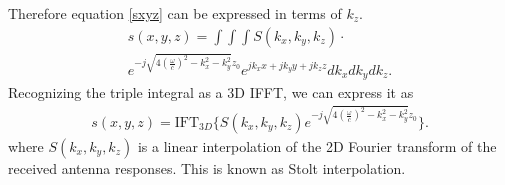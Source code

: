 \documentclass[twocolumn]{article}
\begin{document}
Therefore equation \ref{sxyz} can be expressed in terms of $k_z$.
\begin{gather}
	s(x,y,z) = \int \int \int    S(k_x, k_y, k_z) \cdot \nonumber \\
	e^{-j \sqrt{ 4 (\frac{\omega}{c})^2 - k_x^2 - k_y^2 } z_0} e^{j k_x x + j k_y y + j k_z z} dk_x dk_y dk_z.
\end{gather}
Recognizing the triple integral as a 3D IFFT, we can express it as
\begin{gather}
	s(x,y,z) = \text{IFT}_{3D}  \{  S(k_x, k_y, k_z) e^{-j \sqrt{ 4 (\frac{\omega}{c})^2 - k_x^2 - k_y^2 } z_0} \} .
\end{gather}
where $S(k_x, k_y, k_z)$ is a linear interpolation of the 2D Fourier transform of the received antenna responses. This is known as Stolt interpolation.
\end{document}
